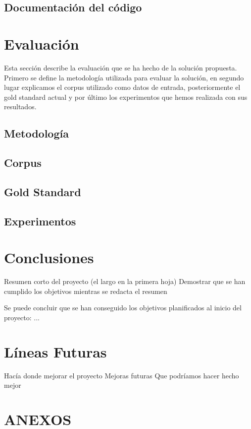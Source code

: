 \documentclass[spanish,12pt, a4paper,twoside]{paper}
\let\oldsection\section
\def\section{\cleardoublepage\oldsection}
\begin{document}
\subsection{Documentación del código}\label{sec:javadoc}


\section{Evaluación}\label{sec:evaluacion}
Esta sección describe la evaluación que se ha hecho de la solución propuesta. Primero se define la metodología utilizada para evaluar la solución, en segundo lugar explicamos el corpus utilizado como datos de entrada, posteriormente el gold standard actual y por último los experimentos que hemos realizada con sus resultados.
\subsection{Metodología}\label{sec:metodologia}

\subsection{Corpus}\label{sec:corpus}
\subsection{Gold Standard}\label{sec:goldstandard}
\subsection{Experimentos}\label{sec:experimentos}


\section{Conclusiones}\label{conclusiones}
Resumen corto del proyecto (el largo en la primera hoja)
Demostrar que se han cumplido los objetivos mientras se redacta el resumen

Se puede concluir que se han conseguido los objetivos planificados al inicio del proyecto: ...

\section{Líneas Futuras}\label{lineasfuturas}
Hacía donde mejorar el proyecto
Mejoras futuras
Que podríamos hacer hecho mejor

\section*{ANEXOS}

\newpage



\end{document}
